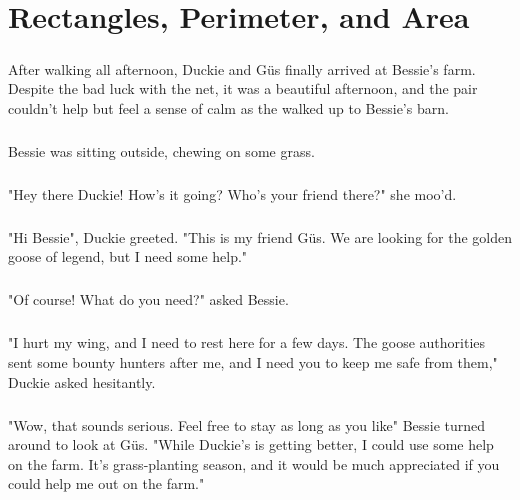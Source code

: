  \chapter{Rectangles, Perimeter, and Area}
 \paragraph{} After walking all afternoon, Duckie and G{\"u}s finally arrived at Bessie's farm. Despite the bad luck with the net, it was a beautiful afternoon, and the pair couldn't help but feel a sense of calm as the walked up to Bessie's barn.
 \paragraph{} Bessie was sitting outside, chewing on some grass.
 \paragraph{} "Hey there Duckie! How's it going? Who's your friend there?" she moo'd.
 \paragraph{} "Hi Bessie", Duckie greeted. "This is my friend G{\"u}s. We are looking for the golden goose of legend, but I need some help."
 \paragraph{} "Of course! What do you need?" asked Bessie.
 \paragraph{} "I hurt my wing, and I need to rest here for a few days. The goose authorities sent some bounty hunters after me, and I need you to keep me safe from them," Duckie asked hesitantly.
 \paragraph{} "Wow, that sounds serious. Feel free to stay as long as you like" Bessie turned around to look at G{\"u}s. "While Duckie's is getting better, I could use some help on the farm. It's grass-planting season, and it would be much appreciated if you could help me out on the farm."
